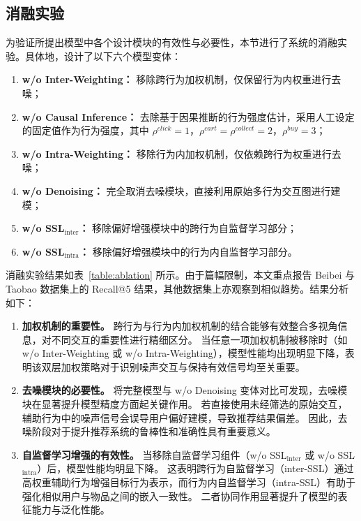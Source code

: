 \subsection{消融实验}
为验证所提出模型中各个设计模块的有效性与必要性，本节进行了系统的消融实验。具体地，设计了以下六个模型变体：

\begin{enumerate}
    \item \textbf{w/o Inter-Weighting：} 移除跨行为加权机制，仅保留行为内权重进行去噪；
    \item \textbf{w/o Causal Inference：} 去除基于因果推断的行为强度估计，采用人工设定的固定值作为行为强度，其中 $\rho^{click}=1$，$\rho^{cart}=\rho^{collect}=2$，$\rho^{buy}=3$；
    \item \textbf{w/o Intra-Weighting：} 移除行为内加权机制，仅依赖跨行为权重进行去噪；
    \item \textbf{w/o Denoising：} 完全取消去噪模块，直接利用原始多行为交互图进行建模；
    \item \textbf{w/o SSL$_{\text{inter}}$：} 移除偏好增强模块中的跨行为自监督学习部分；
    \item \textbf{w/o SSL$_{\text{intra}}$：} 移除偏好增强模块中的行为内自监督学习部分。
\end{enumerate}

消融实验结果如表~\ref{table:ablation} 所示。由于篇幅限制，本文重点报告 Beibei 与 Taobao 数据集上的 Recall@5 结果，其他数据集上亦观察到相似趋势。结果分析如下：

\begin{enumerate}
    \item \textbf{加权机制的重要性。}  
    跨行为与行为内加权机制的结合能够有效整合多视角信息，对不同交互的重要性进行精细区分。  
    当任意一项加权机制被移除时（如 w/o Inter-Weighting 或 w/o Intra-Weighting），模型性能均出现明显下降，表明该双层加权策略对于识别噪声交互与保持有效信号均至关重要。

    \item \textbf{去噪模块的必要性。}  
    将完整模型与 w/o Denoising 变体对比可发现，去噪模块在显著提升模型精度方面起关键作用。  
    若直接使用未经筛选的原始交互，辅助行为中的噪声信号会误导用户偏好建模，导致推荐结果偏差。  
    因此，去噪阶段对于提升推荐系统的鲁棒性和准确性具有重要意义。

    \item \textbf{自监督学习增强的有效性。}  
    当移除自监督学习组件（w/o SSL$_{\text{inter}}$ 或 w/o SSL$_{\text{intra}}$）后，模型性能均明显下降。  
    这表明跨行为自监督学习（inter-SSL）通过高权重辅助行为增强目标行为表示，而行为内自监督学习（intra-SSL）有助于强化相似用户与物品之间的嵌入一致性。  
    二者协同作用显著提升了模型的表征能力与泛化性能。
\end{enumerate}


